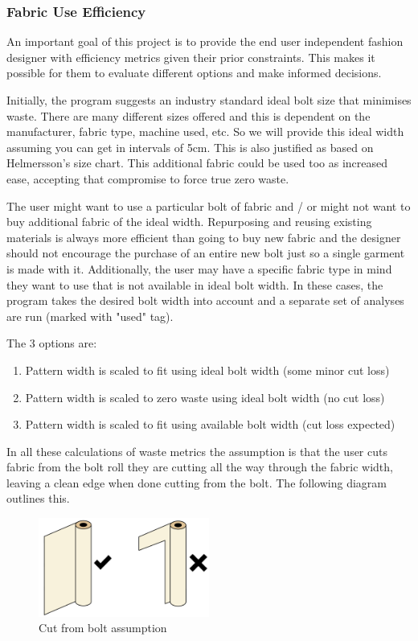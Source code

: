 
\subsubsection{Fabric Use Efficiency}
An important goal of this project is to provide the end user independent fashion designer with efficiency metrics given their prior constraints. This makes it possible for them to evaluate different options and make informed decisions.

Initially, the program suggests an industry standard ideal bolt size that minimises waste. There are many different sizes offered and this is dependent on the manufacturer, fabric type, machine used, etc. So we will provide this ideal width assuming you can get in intervals of 5cm. This is also justified as based on Helmersson's size chart. This additional fabric could be used too as increased ease, accepting that compromise to force true zero waste.

The user might want to use a particular bolt of fabric and / or might not want to buy additional fabric of the ideal width. Repurposing and reusing existing materials is always more efficient than going to buy new fabric and the designer should not encourage the purchase of an entire new bolt just so a single garment is made with it. Additionally, the user may have a specific fabric type in mind they want to use that is not available in ideal bolt width. In these cases, the program takes the desired bolt width into account and a separate set of analyses are run (marked with "used" tag).

The 3 options are:
\begin{enumerate}
    \item Pattern width is scaled to fit using ideal bolt width (some minor cut loss)
    \item Pattern width is scaled to zero waste using ideal bolt width (no cut loss)
    \item Pattern width is scaled to fit using available bolt width (cut loss expected)
\end{enumerate}

In all these calculations of waste metrics the assumption is that the user cuts fabric from the bolt roll they are cutting all the way through the fabric width, leaving a clean edge when done cutting from the bolt. The following diagram outlines this.

\begin{figure} [htb]
    \centering
    \includegraphics[width = 0.5\textwidth]{Images/bolt cut assumption.png}
    \caption{Cut from bolt assumption}
    \label{fig:cut from bolt}
\end{figure}

